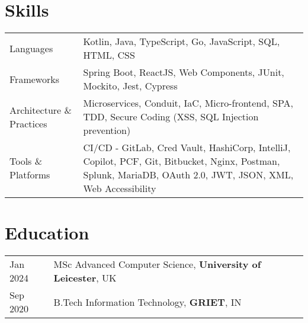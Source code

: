 \documentclass[a4paper,12pt]{article}
\begin{document}
\section{Skills}
\begin{tabularx}{\linewidth}{@{}l X@{}}
Languages & Kotlin, Java, TypeScript, Go, JavaScript, SQL, HTML, CSS\\
Frameworks & Spring Boot, ReactJS, Web Components, JUnit, Mockito, Jest, Cypress\\
Architecture \& Practices & Microservices, Conduit, IaC, Micro-frontend, SPA, TDD, Secure Coding (XSS, SQL Injection prevention) \\
Tools \& Platforms & CI/CD - GitLab, Cred Vault, HashiCorp, IntelliJ, Copilot, PCF, Git, Bitbucket, Nginx, Postman, Splunk, MariaDB, OAuth 2.0, JWT, JSON, XML, Web Accessibility \\
\end{tabularx}
\section{Education}
\begin{tabularx}{\linewidth}{@{}l X@{}} 	
Jan 2024 & MSc Advanced Computer Science, \textbf{University of Leicester}, UK \\
Sep 2020 & B.Tech Information Technology, \textbf{GRIET}, IN \\
\end{tabularx}
\end{document}
